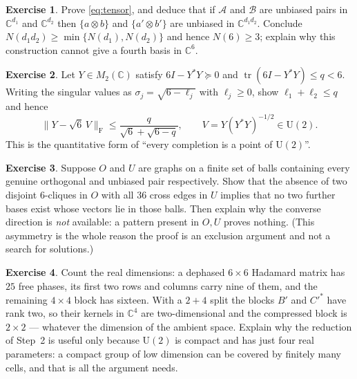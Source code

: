 \documentclass[11pt]{article}
\theoremstyle{definition}
\theoremstyle{plain}
\theoremstyle{definition}
\newtheorem{exercise}{Exercise}
\newcommand{\C}{\mathbb{C}}
\newcommand{\U}{\mathrm{U}}
\newcommand{\norm}[1]{\lVert #1\rVert}
\newcommand{\Frob}{\mathrm{F}}
\DeclareMathOperator{\tr}{tr}
\begin{document}
\begin{exercise}\label{ex:tensor}
Prove \eqref{eq:tensor}, and deduce that if $\mathcal A$ and $\mathcal B$ are unbiased pairs in
$\C^{d_1}$ and $\C^{d_2}$ then $\{a\otimes b\}$ and $\{a'\otimes b'\}$ are unbiased in
$\C^{d_1d_2}$. Conclude $N(d_1d_2)\ge\min\{N(d_1),N(d_2)\}$ and hence $N(6)\ge3$; explain why this
construction cannot give a fourth basis in $\C^6$.
\end{exercise}

\begin{exercise}\label{ex:polar}
Let $Y\in M_2(\C)$ satisfy $6I-Y^*Y\succeq0$ and $\tr(6I-Y^*Y)\le q<6$. Writing the singular values
as $\sigma_j=\sqrt{6-\ell_j}$ with $\ell_j\ge0$, show $\ell_1+\ell_2\le q$ and hence
\[
\norm{Y-\sqrt6\,V}_{\Frob}\le\frac{q}{\sqrt6+\sqrt{6-q}},\qquad V=Y(Y^*Y)^{-1/2}\in\U(2).
\]
This is the quantitative form of ``every completion is a point of $\U(2)$''.
\end{exercise}

\begin{exercise}\label{ex:logic}
Suppose $O$ and $U$ are graphs on a finite set of balls containing every genuine orthogonal and
unbiased pair respectively. Show that the absence of two disjoint $6$-cliques in $O$ with all $36$
cross edges in $U$ implies that no two further bases exist whose vectors lie in those balls. Then
explain why the converse direction is \emph{not} available: a pattern present in $O,U$ proves nothing.
(This asymmetry is the whole reason the proof is an exclusion argument and not a search for
solutions.)
\end{exercise}

\begin{exercise}\label{ex:count}
Count the real dimensions: a dephased $6\times6$ Hadamard matrix has $25$ free phases, its first two
rows and columns carry nine of them, and the remaining $4\times4$ block has sixteen. With a $2+4$ split
the blocks $B'$ and $C'^*$ have rank two, so their kernels in $\C^4$ are two-dimensional and the
compressed block is $2\times2$ --- whatever the dimension of the ambient space. Explain why the
reduction of Step~2 is useful only because $\U(2)$ is compact and has just four real parameters: a
compact group of low dimension can be covered by finitely many cells, and that is all the argument
needs.
\end{exercise}
\end{document}
